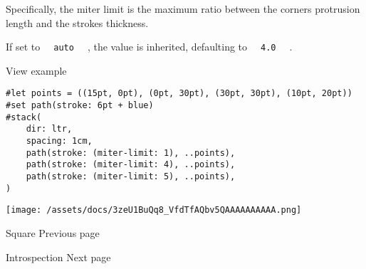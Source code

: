 Specifically, the miter limit is the maximum ratio between the
corner\textquotesingle s protrusion length and the
stroke\textquotesingle s thickness.

If set to \texttt{\ }{\texttt{\ auto\ }}\texttt{\ } , the value is
inherited, defaulting to \texttt{\ }{\texttt{\ 4.0\ }}\texttt{\ } .


View example

\begin{verbatim}
#let points = ((15pt, 0pt), (0pt, 30pt), (30pt, 30pt), (10pt, 20pt))
#set path(stroke: 6pt + blue)
#stack(
    dir: ltr,
    spacing: 1cm,
    path(stroke: (miter-limit: 1), ..points),
    path(stroke: (miter-limit: 4), ..points),
    path(stroke: (miter-limit: 5), ..points),
)
\end{verbatim}

\texttt{[image: /assets/docs/3zeU1BuQq8\_VfdTfAQbv5QAAAAAAAAAA.png]}

\href{/docs/reference/visualize/square/}{\pandocbounded{}}

{ Square } { Previous page }

\href{/docs/reference/introspection/}{\pandocbounded{}}

{ Introspection } { Next page }
